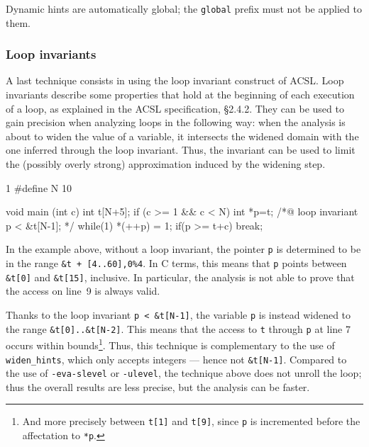 \documentclass{frama-c-book}
\begin{document}
Dynamic hints are automatically global; the \lstinline|global| prefix must not
be applied to them.

\subsubsection{Loop invariants}

A last technique consists in using the loop invariant construct of ACSL.
Loop invariants describe some
properties that hold at the beginning of each execution of a loop,
as explained in the ACSL specification, \S2.4.2.
%
They can be used to gain precision when analyzing loops in
the following way: when the analysis is about to widen the value of a
variable, it intersects the widened domain with the one inferred through
the loop invariant. Thus, the invariant can be used to limit the
(possibly overly strong) approximation induced by the widening step.

\begin{listing}{1}
#define N 10

void main (int c)
{
  int t[N+5];
  if (c >= 1 && c < N)
  {
    int *p=t;
    /*@ loop invariant p < &t[N-1]; */
    while(1)
    {
      *(++p) = 1;
      if(p >= t+c)
        break;
    }
  }
}
\end{listing}
In the example above, without a loop invariant, the pointer \lstinline+p+
is determined to be in the range \lstinline|&t + [4..60],0%4|. In C terms, this
means that \lstinline+p+ points between \lstinline+&t[0]+
and \lstinline+&t[15]+, inclusive. In particular, the analysis is not able
to prove that the access on line~9 is always valid.

Thanks to the loop invariant \lstinline|p < &t[N-1]|, the variable
\lstinline+p+ is
instead widened to the range \lstinline+&t[0]..&t[N-2]+.
This means that the access to \lstinline+t+
through \lstinline+p+ at line 7 occurs
within bounds\footnote{And more precisely between \lstinline+t[1]+ and
\lstinline+t[9]+, since \lstinline+p+
is incremented before the affectation to \lstinline+*p+.}.
Thus, this technique is complementary to the use of
\lstinline+widen_hints+, which only accepts integers --- hence not
\lstinline+&t[N-1]+. Compared to the use
of \lstinline+-eva-slevel+ or \lstinline+-ulevel+,
the technique above does not unroll the loop; thus the overall results
are less precise, but the analysis can be faster.
\end{document}
